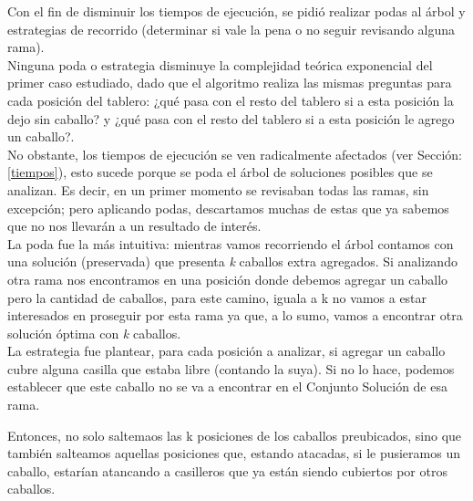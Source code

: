 Con el fin de disminuir los tiempos de ejecuci\'on, se pidi\'o realizar podas al \'arbol y estrategias de recorrido (determinar si vale la pena o no seguir revisando alguna rama).\\

Ninguna poda o estrategia disminuye la complejidad te\'orica exponencial del primer caso estudiado, dado que el algoritmo realiza las mismas preguntas para cada posici\'on del tablero: ¿qu\'e pasa con el resto del tablero si a esta posici\'on la dejo sin caballo? y ¿qu\'e pasa con el resto del tablero si a esta posici\'on le agrego un caballo?.\\

No obstante, los tiempos de ejecuci\'on se ven radicalmente afectados (ver Secci\'on: \ref{tiempos}), esto sucede porque se poda el \'arbol de soluciones posibles que se analizan. Es decir, en un primer momento se revisaban todas las ramas, sin excepci\'on; pero aplicando podas, descartamos muchas de estas que ya sabemos que no nos llevar\'an a un resultado de inter\'es.\\


La poda fue la m\'as intuitiva: mientras vamos recorriendo el \'arbol contamos con una soluci\'on (preservada) que presenta \emph{k} caballos extra agregados. Si analizando otra rama nos encontramos en una posici\'on donde debemos agregar un caballo pero la cantidad de caballos, para este camino, iguala a k no vamos a estar interesados en proseguir por esta rama ya que, a lo sumo, vamos a encontrar otra soluci\'on \'optima con \emph{k} caballos.\\


La estrategia fue plantear, para cada posición a analizar, si agregar un caballo cubre alguna casilla que estaba libre (contando la suya). Si no lo hace, podemos establecer que este caballo no se va a encontrar en el Conjunto Solución de esa rama.

 Entonces, no solo saltemaos las k posiciones de los caballos preubicados, sino que también salteamos aquellas posiciones que, estando atacadas, si le pusieramos un caballo, estar\'ian atancando a casilleros que ya est\'an siendo cubiertos por otros caballos.
  
